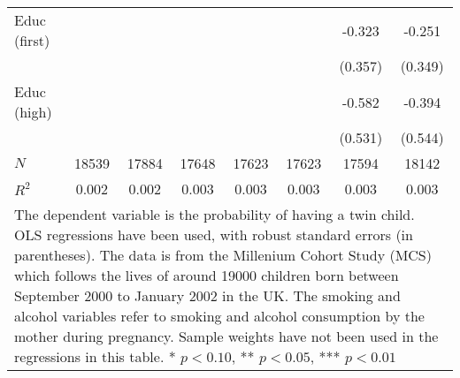 \begin{table}[h!]
{\begin{tabular}{l*{7}{c}}
Educ (first)  &               &               &               &               &               &      -0.323   &      -0.251   \\
            &               &               &               &               &               &     (0.357)   &     (0.349)   \\

Educ (high)   &               &               &               &               &               &      -0.582   &      -0.394   \\
            &               &               &               &               &               &     (0.531)   &     (0.544)   \\

\midrule
\(N\)       &       18539   &       17884   &       17648   &       17623   &       17623   &       17594   &       18142   \\
\(R^{2}\)   &       0.002   &       0.002   &       0.003   &       0.003   &       0.003   &       0.003   &       0.003   \\
\bottomrule
\multicolumn{8}{p{13.5cm}}{\vspace{0.2mm}\footnotesize The dependent variable is the probability of having a twin child. OLS regressions have been used, with robust standard errors (in parentheses). The data is from the Millenium Cohort Study (MCS) which follows the lives of around 19000 children born between September 2000 to January 2002 in the UK. The smoking and alcohol variables refer to smoking and alcohol consumption by the mother during pregnancy. Sample weights have not been used in the regressions in this table. * \(p<0.10\), ** \(p<0.05\), *** \(p<0.01\)}\\
\end{tabular}}
\end{table}

